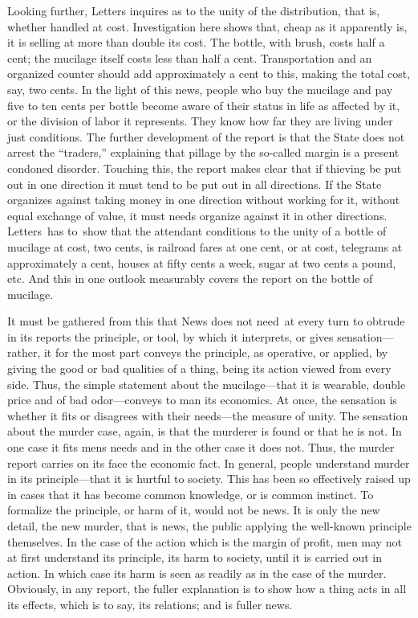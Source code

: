 \documentclass[openany,nobib]{tufte-book}
\begin{document}
Looking further, Letters inquires as to the unity of the distribution,
that is, whether handled at cost. Investigation here shows that, cheap
as it apparently is, it is selling at more than double its cost. The
bottle, with brush, costs half a cent; the mucilage itself costs less
than half a cent. Transportation and an organized counter should add
approximately a cent to this, making the total cost, say, two cents. In
the light of this news, people who buy the mucilage and pay five to ten
cents per bottle become aware of their status in life as affected by it,
or the division of labor it represents. They know how far they are
living under just conditions. The further development of the report is
that the State does not arrest the ``traders,'' explaining that pillage
by the so-called margin is a present condoned disorder. Touching this,
the report makes clear that if thieving be put out in one direction it
must tend to be put out in all directions. If the State organizes
against taking money in one direction without working for it, without
equal exchange of value, it must needs organize against it in other
directions. Letters~has to~show that the attendant conditions to the
unity of a bottle of mucilage at cost, two cents, is railroad fares at
one cent, or at cost, telegrams at approximately a cent, houses at fifty
cents a week, sugar at two cents a pound, etc. And this in one outlook
measurably covers the report on the bottle of mucilage.~

It must be gathered from this that News does not need~at every turn to
obtrude in its reports the principle, or tool, by which it interprets,
or gives sensation---rather, it for the most part conveys the principle,
as operative, or applied, by giving the good or bad qualities of a
thing, being its action viewed from every side. Thus, the simple
statement about the mucilage---that it is wearable, double price and of
bad odor---conveys to man its economics. At once, the sensation is
whether it fits or disagrees with their needs---the measure of unity.
The sensation about the murder case, again, is that the murderer is
found or that he is not. In one case it fits men\textquotesingle s needs
and in the other case it does not. Thus, the murder report carries on
its face the economic fact. In general, people understand murder in its
principle---that it is hurtful to society. This has been so effectively
raised up in cases that it has become common knowledge, or is common
instinct. To formalize the principle, or harm of it, would not be news.
It is only the new detail, the new murder, that is news, the public
applying the well-known principle themselves. In the case of the action
which is the margin of profit, men may not at first understand its
principle, its harm to society, until it is carried out in action. In
which case its harm is seen as readily as in the case of the murder.
Obviously, in any report, the fuller explanation is to show how a thing
acts in all its effects, which is to say, its relations; and is fuller
news.~~
\end{document}
